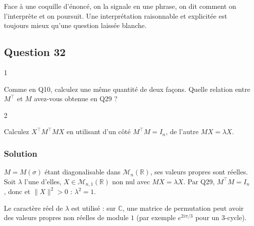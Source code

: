 \documentclass[11pt,a4paper]{article}
\newcommand{\equationajustee}[1]{%
  \sbox{\boiteequation}{$\displaystyle #1$}%
  \ifdim\wd\boiteequation>\linewidth
    \[\resizebox{\linewidth}{!}{\usebox{\boiteequation}}\]%
  \else
    \[#1\]%
  \fi}
\begin{document}
\begin{jury}

Face à une coquille d'énoncé, on la signale en une phrase, on dit comment on l'interprète et on poursuit. Une interprétation raisonnable et explicitée est toujours mieux qu'une question laissée blanche.

\end{jury}

\hypertarget{question-32}{%
\subsection{Question 32}\label{question-32}}

\begin{indication}{1}

Comme en Q10, calculez une même quantité de deux façons. Quelle relation entre \(M^\top\) et \(M\) avez-vous obtenue en Q29 ?

\end{indication}

\begin{indication}{2}

Calculez \(X^\top M^\top MX\) en utilisant d'un côté \(M^\top M=I_n\), de l'autre \(MX=\lambda X\).

\end{indication}

\hypertarget{solution-31}{%
\subsubsection{Solution}\label{solution-31}}

\(M=M(\sigma)\) étant diagonalisable dans \(\mathcal M_n(\mathbb R)\), ses valeurs propres sont réelles. Soit \(\lambda\) l'une d'elles, \(X\in\mathcal M_{n,1}(\mathbb R)\) non nul avec \(MX=\lambda X\). Par Q29, \(M^\top M=I_n\), donc
\equationajustee{\begin{aligned}
\|X\|^2&=X^\top M^\top MX\\
&=(MX)^\top(MX)\\
&=\lambda^2\|X\|^2,
\end{aligned}}
et \(\|X\|^2>0\) : \(\boxed{\lambda^2=1.}\)

\begin{piege}

Le caractère réel de \(\lambda\) est utilisé : sur \(\mathbb C\), une matrice de permutation peut avoir des valeurs propres non réelles de module \(1\) (par exemple \(e^{2i\pi/3}\) pour un \(3\)-cycle).

\end{piege}
\end{document}
